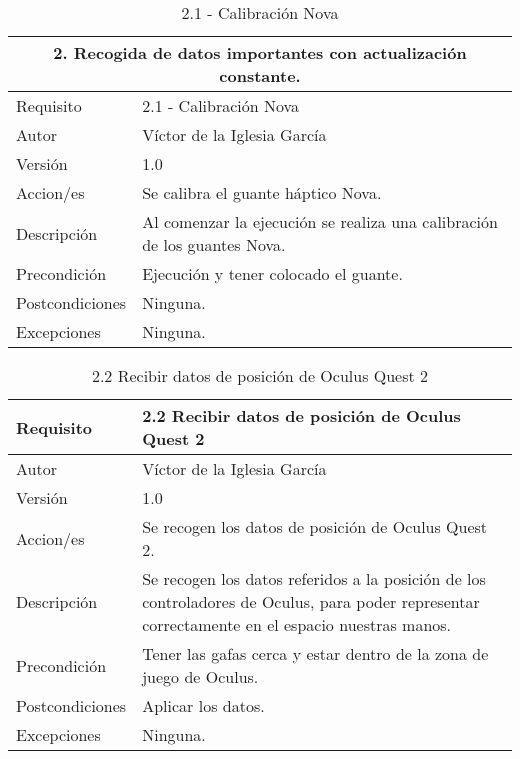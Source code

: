 \begin{table}[h]
    \centering
    \begin{tabular}{| m{3cm} | m{8cm} |}
    \hline
     \multicolumn{2}{|c|}{\textbf{2. Recogida de datos importantes con actualización constante.}}                \\ \hline 
        Requisito & 2.1 - Calibración Nova  \\ \hline
       Autor  &  Víctor de la Iglesia García \\ \hline
        Versión & 1.0 \\ \hline
        Accion/es & Se calibra el guante háptico Nova. \\ \hline
         Descripción & Al comenzar la ejecución se realiza una calibración de los guantes Nova. \\ \hline
        Precondición & Ejecución y tener colocado el guante. \\ \hline
        Postcondiciones & Ninguna. \\ \hline
        Excepciones & Ninguna. \\ \hline
    \end{tabular}
    \caption{2.1 - Calibración Nova}
    \label{2.1 - Calibración Nova}
\end{table}

\begin{table}[h]
    \centering
    \begin{tabular}{| m{3cm} | m{8.7cm} |}
    \hline
        Requisito & 2.2 Recibir datos de posición de Oculus Quest 2\\ \hline
       Autor  &  Víctor de la Iglesia García \\ \hline
        Versión & 1.0 \\ \hline
        Accion/es & Se recogen los datos de posición de Oculus Quest 2. \\ \hline
         Descripción & Se recogen los datos referidos a la posición de los controladores de Oculus, para poder representar correctamente en el espacio nuestras manos. \\ \hline
        Precondición & Tener las gafas cerca y estar dentro de la zona de juego de Oculus. \\ \hline
        Postcondiciones & Aplicar los datos. \\ \hline
        Excepciones & Ninguna. \\ \hline
    \end{tabular}
    \caption{2.2 Recibir datos de posición de Oculus Quest 2}
    \label{2.2 Recibir datos de posición de Oculus Quest 2}
\end{table}

